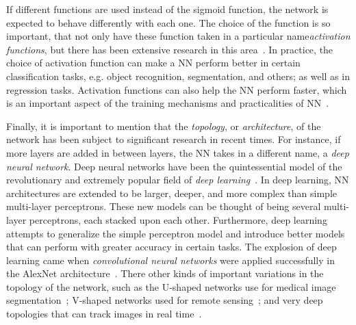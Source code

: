 If different functions are used instead of the sigmoid function, the network is expected to 
behave differently with each one. The choice of the function is so important, that not only 
have these function taken in a particular name\textemdash \emph{activation functions}\textemdash, but there has been extensive research in this area~\cite{chenUniversalApproximationNonlinear1995,nwankpaActivationFunctionsComparison2018,agostinelliLearningActivationFunctions2015,ramachandranSearchingActivationFunctions2017}. 
In practice, the choice of activation function can make a NN perform better in 
certain classification tasks, e.g. object recognition, segmentation, and others; as well as 
in regression tasks. Activation functions can also help the NN perform faster, which is 
an important aspect of the training mechanisms and practicalities of
NN~\cite{fengPerformanceAnalysisVarious2019,biswasTanhSoftDynamicTrainable2021}.

Finally, it is important to mention that the \emph{topology}, or \emph{architecture}, of 
the network has been subject to significant research in recent times. For instance, if more 
layers are added in between layers, the NN takes in a different name, a \emph{deep neural network}. Deep neural networks have been the quintessential model of the revolutionary and 
extremely popular field of \emph{deep learning}~\cite{goodfellowDeepLearning2016}. In deep 
learning, NN architectures are extended to be larger, deeper, and more complex than simple 
multi-layer perceptrons. These new models can be thought of being several multi-layer 
perceptrons, each stacked upon each other.
Furthermore, deep learning attempts to generalize the simple perceptron model and introduce 
better models that can perform with greater accuracy in certain tasks. The explosion of 
deep learning came when \emph{convolutional neural networks} were applied successfully in 
the AlexNet architecture~\cite{krizhevskyImageNetClassificationDeep2012}. There other kinds 
of important variations in the topology of the network, such as the U-shaped networks use 
for medical image segmentation~\cite{ronnebergerUNetConvolutionalNetworks2015}; V-shaped 
networks used for remote sensing~\cite{abdollahiVNetEndtoEndFully2020}; and very deep 
topologies that can track images in real time~\cite{redmonYOLOv3IncrementalImprovement2018}.

